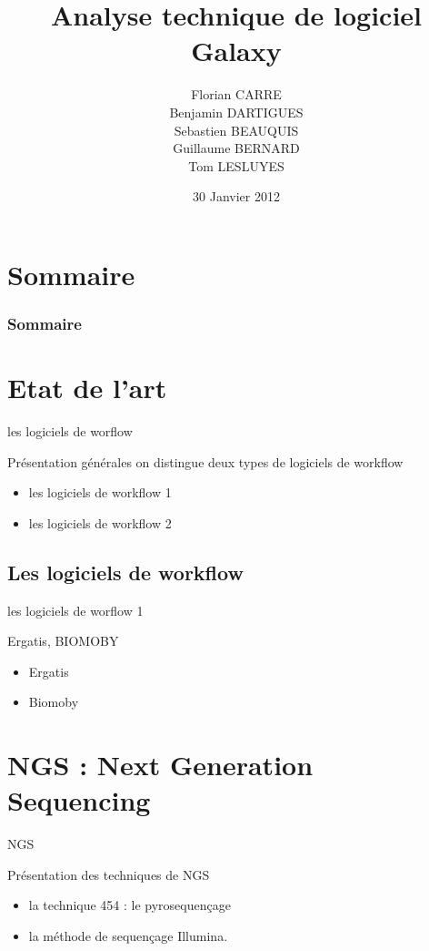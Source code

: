 \documentclass[12pt]{beamer}
\title[Galaxy]{Analyse technique de logiciel\\ Galaxy}
\author[F. C. | B. D. | S. B. | G. B. | T. L.]{Florian CARRE\\Benjamin DARTIGUES\\Sebastien BEAUQUIS\\Guillaume BERNARD\\Tom LESLUYES}
\date{30 Janvier 2012}
\institute[]{Université de Bordeaux 1}
\begin{document}
\maketitle

\section*{Sommaire}
\begin{frame}
\frametitle{Sommaire}
\tableofcontents[pausesections]
\end{frame}

\section{Etat de l'art}
\begin{frame}{les logiciels de worflow}
\begin{block}{Présentation générales}
on distingue deux types de logiciels de workflow
\begin{itemize}
 \item les logiciels de workflow 1
\item les logiciels de workflow 2
\end{itemize}
\end{block}
\end{frame}


\subsection{Les logiciels de workflow }
\begin{frame}{les logiciels de worflow 1}
\begin{block}{Ergatis, BIOMOBY}
\begin{itemize}
 \item Ergatis
\item Biomoby
\end{itemize}
\end{block}
\end{frame}



\section{NGS : Next Generation Sequencing}
\begin{frame}{NGS}
\begin{block}{Présentation des techniques de NGS}
\begin{itemize}
 \item la technique 454 : le pyrosequençage
\item la méthode de sequençage Illumina.
\end{itemize}
\end{block}
\end{frame}
\end{document}
